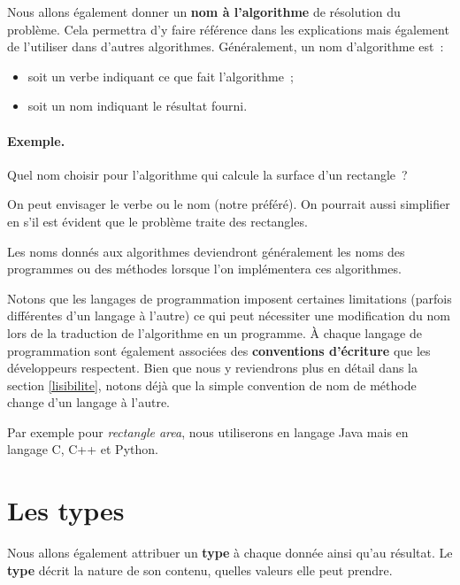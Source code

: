 		Nous allons également donner un \textbf{nom à l’algorithme}
		de résolution du problème.
		Cela permettra d’y faire référence dans les explications
		mais également de l’utiliser dans d’autres algorithmes.
		Généralement, un nom d’algorithme est~:
		\begin{itemize}
		\item soit un verbe indiquant ce que fait l’algorithme~;
		\item soit un nom indiquant le résultat fourni.	
		\end{itemize}
	
		\begin{Emphase}
			\paragraph{Exemple.}	
			Quel nom choisir pour l’algorithme 
			qui calcule la surface d’un rectangle~?
	
			On peut envisager 
			le verbe 
			ou le nom  (notre préféré).
			On pourrait aussi simplifier en 
			s’il est évident que le problème traite des rectangles.
		\end{Emphase}
	
		Les noms donnés aux algorithmes deviendront généralement les noms des
		programmes ou des méthodes lorsque l'on implémentera ces algorithmes. 

		Notons que les langages de programmation imposent certaines limitations
		(parfois différentes d’un langage à l’autre) ce qui peut nécessiter une
		modification du nom lors de la traduction de l’algorithme en un
		programme. À chaque langage de programmation sont également associées
		des \textbf{conventions d'écriture} que les développeurs respectent.
		Bien que nous y reviendrons plus en détail dans la section
		\ref{lisibilite}, notons déjà que la simple convention de nom de méthode
		change d'un langage à l'autre. 
		
		Par exemple pour \textit{rectangle area}, nous utiliserons
		 en langage Java mais  en langage
		C, C++ et Python. 

	\section{Les types}
		
		Nous allons également attribuer un \textbf{type} à chaque donnée ainsi
		qu’au résultat.  Le \textbf{type} décrit la nature de son contenu,
		quelles valeurs elle peut prendre.
		
